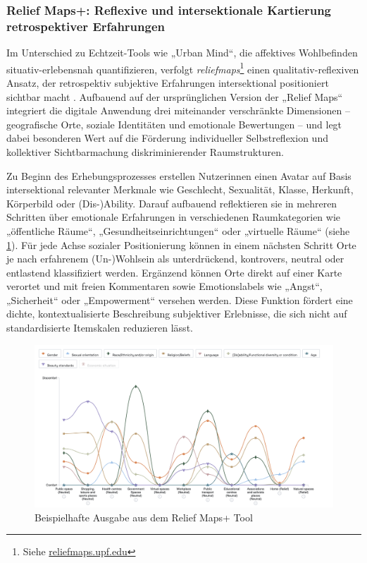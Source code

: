 \subsubsection{Relief Maps+: Reflexive und intersektionale Kartierung retrospektiver Erfahrungen}

Im Unterschied zu Echtzeit-Tools wie „Urban Mind“, die affektives Wohlbefinden situativ-erlebensnah quantifizieren, verfolgt \textit{\gls{reliefmaps}}\footnote{Siehe \href{https://reliefmaps.upf.edu/}{reliefmaps.upf.edu}} einen qualitativ-reflexiven Ansatz, der retrospektiv subjektive Erfahrungen intersektional positioniert sichtbar macht \parencite{rodo-de-zarateDevelopingGeographiesIntersectionality2014}. Aufbauend auf der ursprünglichen Version der „Relief Maps“ integriert die digitale Anwendung drei miteinander verschränkte Dimensionen – geografische Orte, soziale Identitäten und emotionale Bewertungen – und legt dabei besonderen Wert auf die Förderung individueller Selbstreflexion und kollektiver Sichtbarmachung diskriminierender Raumstrukturen.

Zu Beginn des Erhebungsprozesses erstellen Nutzer\genderstern innen einen Avatar auf Basis intersektional relevanter Merkmale wie Geschlecht, Sexualität, Klasse, Herkunft, Körperbild oder (Dis-)Ability. Darauf aufbauend reflektieren sie in mehreren Schritten über emotionale Erfahrungen in verschiedenen Raumkategorien wie „öffentliche Räume“, „Gesundheitseinrichtungen“ oder „virtuelle Räume“ (siehe \cref{fig:relief_maps_plus_screenshot_1}). Für jede Achse sozialer Positionierung können in einem nächsten Schritt Orte je nach erfahrenem (Un-)Wohlsein als unterdrückend, kontrovers, neutral oder entlastend klassifiziert werden. Ergänzend können Orte direkt auf einer Karte verortet und mit freien Kommentaren sowie Emotionslabels wie „Angst“, „Sicherheit“ oder „Empowerment“ versehen werden. Diese Funktion fördert eine dichte, kontextualisierte Beschreibung subjektiver Erlebnisse, die sich nicht auf standardisierte Itemskalen reduzieren lässt.

\begin{figure}[htbp]
    \centering
    \includegraphics[width=\textwidth]{Arbeit/images/reliefmap.png}
    \caption{Beispielhafte Ausgabe aus dem Relief Maps+ Tool}
    \label{fig:relief_maps_plus_screenshot_1}
\end{figure}

